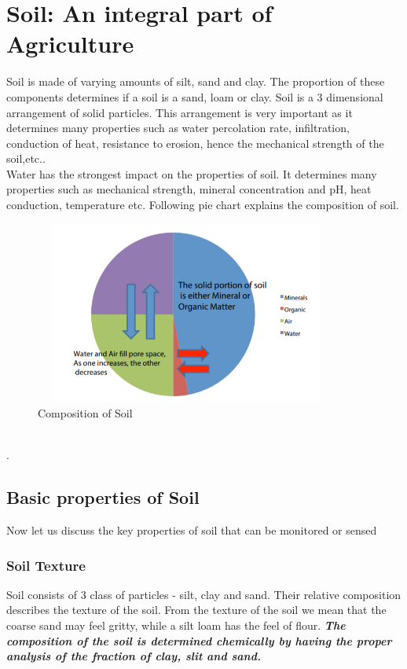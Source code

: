 \documentclass[11pt]{article}
\begin{document}
\section{Soil: An integral part of Agriculture}
Soil is made of varying amounts of silt, sand and clay. The proportion of these components determines if a soil is a sand, loam or clay. Soil is a 3 dimensional arrangement of solid particles. This arrangement is very important as it determines many properties such as water percolation rate, infiltration, conduction of heat, resistance to erosion, hence the mechanical strength of the soil,etc..\\
Water has the strongest impact on the properties of soil. It determines many properties such as mechanical strength, mineral concentration and pH, heat conduction, temperature etc. Following pie chart\cite{ref1} explains the composition of soil.
\begin{figure}[!h]
  \centering
    \vspace*{0 cm}
  \includegraphics[height=60mm,width=100mm]{pie.PNG}
    \caption{Composition of Soil}
  \label{fig:Composition of Soil}
\end{figure}
\\.  
\pagebreak
\subsection{Basic properties of Soil}
Now let us discuss the key properties of soil that can be monitored or sensed
\subsubsection{Soil Texture}
Soil consists of 3 class of particles - silt, clay and sand. Their relative composition describes the texture of the soil. From the texture of the soil we mean that the coarse sand may feel gritty,
while a silt loam has the feel of
flour. \textit{\textbf{The composition of the soil is determined chemically by having the proper analysis of the fraction of clay, slit and sand. }}
\end{document}
